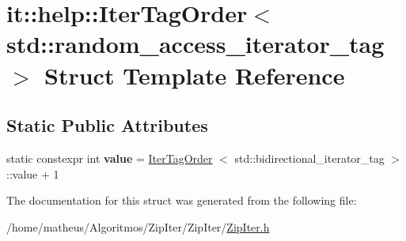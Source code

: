\hypertarget{structit_1_1help_1_1IterTagOrder_3_01std_1_1random__access__iterator__tag_01_4}{}\section{it\+:\+:help\+:\+:Iter\+Tag\+Order$<$ std\+:\+:random\+\_\+access\+\_\+iterator\+\_\+tag $>$ Struct Template Reference}
\label{structit_1_1help_1_1IterTagOrder_3_01std_1_1random__access__iterator__tag_01_4}
\subsection*{Static Public Attributes}
\begin{DoxyCompactItemize}
\item 
static constexpr int {\bfseries value} = \hyperlink{structit_1_1help_1_1IterTagOrder}{Iter\+Tag\+Order} $<$ std\+::bidirectional\+\_\+iterator\+\_\+tag $>$\+::value + 1\hypertarget{structit_1_1help_1_1IterTagOrder_3_01std_1_1random__access__iterator__tag_01_4_ab5e9ed38b408cf717a1f8771f19ddf00}{}\label{structit_1_1help_1_1IterTagOrder_3_01std_1_1random__access__iterator__tag_01_4_ab5e9ed38b408cf717a1f8771f19ddf00}

\end{DoxyCompactItemize}


The documentation for this struct was generated from the following file\+:\begin{DoxyCompactItemize}
\item 
/home/matheus/\+Algoritmos/\+Zip\+Iter/\+Zip\+Iter/\hyperlink{ZipIter_8h}{Zip\+Iter.\+h}\end{DoxyCompactItemize}
